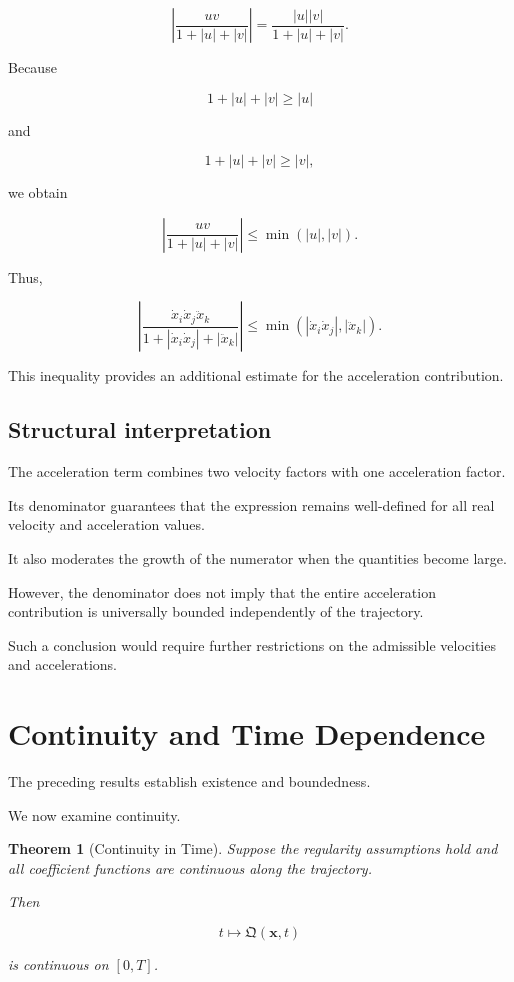 \documentclass[12pt]{article}
\numberwithin{equation}{section}
\newcommand{\Q}{\mathfrak{Q}}
\newtheorem{theorem}{Theorem}[section]
\theoremstyle{definition}
\theoremstyle{remark}
\begin{document}
\[
\left|
\frac{uv}{1+|u|+|v|}
\right|
=
\frac{|u||v|}{1+|u|+|v|}.
\]

Because

\[
1+|u|+|v|\geq|u|
\]

and

\[
1+|u|+|v|\geq|v|,
\]

we obtain

\[
\left|
\frac{uv}{1+|u|+|v|}
\right|
\leq
\min(|u|,|v|).
\]

Thus,

\[
\left|
\frac{
\dot{x}_i\dot{x}_j\ddot{x}_k
}{
1+
|\dot{x}_i\dot{x}_j|
+
|\ddot{x}_k|
}
\right|
\leq
\min\left(
|\dot{x}_i\dot{x}_j|,
|\ddot{x}_k|
\right).
\]

This inequality provides an additional
estimate for the acceleration contribution.

\subsection{Structural interpretation}

The acceleration term combines two velocity
factors with one acceleration factor.

Its denominator guarantees that the
expression remains well-defined for
all real velocity and acceleration values.

It also moderates the growth of the
numerator when the quantities become large.

However, the denominator does not imply
that the entire acceleration contribution
is universally bounded independently
of the trajectory.

Such a conclusion would require further
restrictions on the admissible velocities
and accelerations.


\section{Continuity and Time Dependence}

The preceding results establish existence
and boundedness.

We now examine continuity.

\begin{theorem}[Continuity in Time]

Suppose the regularity assumptions hold
and all coefficient functions are continuous
along the trajectory.

Then

\[
t\longmapsto\Q(\mathbf{x},t)
\]

is continuous on \([0,T]\).

\end{theorem}
\end{document}
